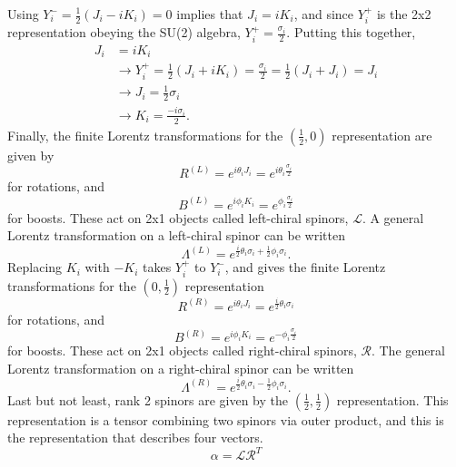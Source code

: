 Using $Y_{i}^{-} = \frac{1}{2}(J_i - iK_i) = 0$ implies that $J_i = iK_i$, and since $Y_{i}^{+}$ is the 2x2 representation obeying the SU(2) algebra, $Y_{i}^{+} = \frac{\sigma_i}{2}$. Putting this together,
\begin{equation}
\begin{split}
J_i &= iK_i \\ 
&\rightarrow Y^+_i = \frac{1}{2}(J_i + iK_i) = \frac{\sigma_i}{2} = \frac{1}{2}(J_i + J_i) = J_i \\
&\rightarrow J_i = \frac{1}{2}\sigma_i \\
&\rightarrow K_i = \frac{-i\sigma_i}{2}.
\end{split}
\end{equation} 
Finally, the finite Lorentz transformations for the $(\frac{1}{2}, 0)$ representation are given by 
\begin{equation}
R^{(L)} = e^{i\theta_i J_i} = e^{i\theta_i \frac{\sigma_i}{2}}   
\end{equation}
for rotations, and
\begin{equation}
B^{(L)} = e^{i\phi_i K_i} = e^{\phi_i \frac{\sigma_i}{2}}   
\end{equation}
for boosts. These act on 2x1 objects called left-chiral spinors, $\mathcal{L}$. A general Lorentz transformation on a left-chiral spinor can be written
\begin{equation}
\Lambda^{(L)} = e^{\frac{i}{2}\theta_i \sigma_i + \frac{1}{2}\phi_i \sigma_i}.
\end{equation}
Replacing $K_i$ with $-K_i$ takes $Y^+_i$ to $Y^-_i$, and gives the finite Lorentz transformations for the $(0, \frac{1}{2})$ representation 
\begin{equation}
R^{(R)} = e^{i\theta_i J_i} = e^{\frac{i}{2}\theta_i \sigma_i}   
\end{equation}
for rotations, and
\begin{equation}
B^{(R)} = e^{i\phi_i K_i} = e^{-\phi_i \frac{\sigma_i}{2}}   
\end{equation}
for boosts. These act on 2x1 objects called right-chiral spinors, $\mathcal{R}$. The general Lorentz transformation on a right-chiral spinor can be written
\begin{equation}
\Lambda^{(R)} = e^{\frac{i}{2}\theta_i \sigma_i - \frac{1}{2}\phi_i \sigma_i}.
\end{equation}
Last but not least, rank 2 spinors are given by the $(\frac{1}{2}, \frac{1}{2})$ representation. This representation is a tensor combining two spinors via outer product, and this is the representation that describes four vectors.
\begin{equation}
\alpha = \mathcal{L} \mathcal{R}^{T}
\end{equation}

